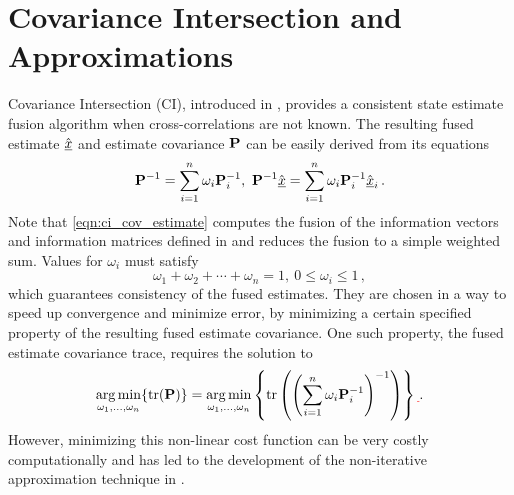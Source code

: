 \documentclass[letterpaper, 10 pt, conference]{ieeeconf}  %
\providecommand{\DIFadd}[1]{{\protect\color{blue}\uwave{#1}}} %
\providecommand{\DIFdel}[1]{{\protect\color{red}\sout{#1}}}                      %
\providecommand{\DIFaddbegin}{} %
\providecommand{\DIFaddend}{} %
\providecommand{\DIFdelbegin}{} %
\providecommand{\DIFdelend}{} %
\begin{document}
\section{Covariance Intersection and Approximations} \label{sec:ci}
Covariance Intersection (CI), introduced in \cite{julierNondivergentEstimationAlgorithm1997}, provides a consistent state estimate fusion algorithm when cross-correlations are not known. The resulting fused estimate $\hat{{\underline{x}}}$ and estimate covariance ${{\mathbf{P}}}$ can be easily derived from its equations
\begin{equation}
   {\ensuremath{{\mathbf{P}}}}^{-1}=\sum_{i=1}^{n}\omega_i {{\mathbf{P}}}_i^{-1},\ {{\mathbf{P}}}^{-1} \hat{{\underline{x}}} =\sum_{i=1}^{n}\omega_i {{\mathbf{P}}}_i^{-1} \hat{{\underline{x}}}_i\,. \label{eqn:ci_cov_estimate}
\end{equation}
Note that \eqref{eqn:ci_cov_estimate} computes the fusion of the information vectors and information matrices defined in \cite{niehsenInformationFusionBased2002} and reduces the fusion to a simple weighted sum.
Values for \DIFaddbegin \DIFadd{weights }\DIFaddend $\omega_i$ must satisfy
\begin{equation}
   \omega_1 + \omega_2 + \cdots + \omega_n = 1,\ 0 \leq \omega_i \leq 1\,, \label{eqn:ci_omega_sum_bound}
\end{equation}
which guarantees consistency of the fused estimates. They are chosen in a way to speed up convergence and minimize error, by minimizing a certain specified property of the resulting fused estimate covariance. One such property, the fused estimate covariance trace, requires the solution to
\begin{equation}
   \argmin_{\omega_1,\dots,\omega_n} \{\tr(\mP)\} = \argmin_{\omega_1,\dots,\omega_n} \left\{\tr\left(\left(\sum_{i=1}^{n}\omega_i \mP_i^{-1}\right)^{-1}\right)\right\}\DIFdelbegin \DIFdel{\,}\DIFdelend . \label{eqn:ci_trace_min}
\end{equation}
However, minimizing this non-linear cost function can be very costly computationally and has led to the development of the non-iterative approximation technique in \cite{niehsenInformationFusionBased2002}.
\end{document}
